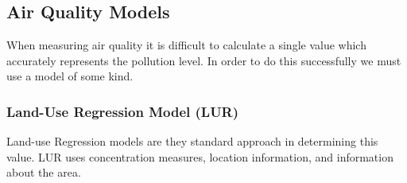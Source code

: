 \subsection{Air Quality Models}\label{airquality}

When measuring air quality it is difficult to calculate a single value which accurately represents the pollution level. In order to do this successfully we must use a model of some kind. 

\subsubsection{Land-Use Regression Model (LUR)}\label{lur}

Land-use Regression models are they standard approach in determining this value. LUR uses concentration measures, location information, and information about the area. 


